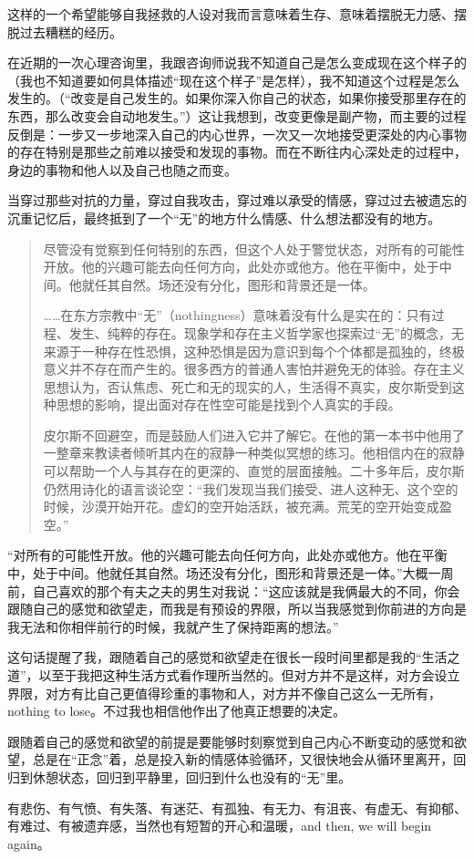 这样的一个希望能够自我拯救的人设对我而言意味着生存、意味着摆脱无力感、摆脱过去糟糕的经历。

在近期的一次心理咨询里，我跟咨询师说我不知道自己是怎么变成现在这个样子的（我也不知道要如何具体描述“现在这个样子”是怎样），我不知道这个过程是怎么发生的。（“改变是自己发生的。如果你深入你自己的状态，如果你接受那里存在的东西，那么改变会自动地发生。”）这让我想到，改变更像是副产物，而主要的过程反倒是：一步又一步地深入自己的内心世界，一次又一次地接受更深处的内心事物的存在\pozhehao{}特别是那些之前难以接受和发现的事物。而在不断往内心深处走的过程中，身边的事物和他人以及自己也随之而变。

当穿过那些对抗的力量，穿过自我攻击，穿过难以承受的情感，穿过过去被遗忘的沉重记忆后，最终抵到了一个“无”的地方\pozhehao{}什么情感、什么想法都没有的地方。

\blockquote{
尽管没有觉察到任何特别的东西，但这个人处于警觉状态，对所有的可能性开放。他的兴趣可能去向任何方向，此处亦或他方。他在平衡中，处于中间。他就任其自然。场还没有分化，图形和背景还是一体。

……在东方宗教中“无”（nothingness）意味着没有什么是实在的：只有过程、发生、纯粹的存在。现象学和存在主义哲学家也探索过“无”的概念，无来源于一种存在性恐惧，这种恐惧是因为意识到每个个体都是孤独的，终极意义并不存在而产生的。很多西方的普通人害怕并避免无的体验。存在主义思想认为，否认焦虑、死亡和无的现实的人，生活得不真实，皮尔斯受到这种思想的影响，提出面对存在性空可能是找到个人真实的手段。

皮尔斯不回避空，而是鼓励人们进入它并了解它。在他的第一本书中他用了一整章来教读者倾听其内在的寂静\pozhehao{}一种类似冥想的练习。他相信内在的寂静可以帮助一个人与其存在的更深的、直觉的层面接触。二十多年后，皮尔斯仍然用诗化的语言谈论空：“我们发现当我们接受、进人这种无、这个空的时候，沙漠开始开花。虚幻的空开始活跃，被充满。荒芜的空开始变成盈空。”

}

“对所有的可能性开放。他的兴趣可能去向任何方向，此处亦或他方。他在平衡中，处于中间。他就任其自然。场还没有分化，图形和背景还是一体。”大概一周前，自己喜欢的那个有夫之夫的男生对我说：“这应该就是我俩最大的不同，你会跟随自己的感觉和欲望走，而我是有预设的界限，所以当我感觉到你前进的方向是我无法和你相伴前行的时候，我就产生了保持距离的想法。”

这句话提醒了我，跟随着自己的感觉和欲望走在很长一段时间里都是我的“生活之道”，以至于我把这种生活方式看作理所当然的。但对方并不是这样，对方会设立界限，对方有比自己更值得珍重的事物和人，对方并不像自己这么一无所有，nothing to lose。不过我也相信他作出了他真正想要的决定。

跟随着自己的感觉和欲望的前提是要能够时刻察觉到自己内心不断变动的感觉和欲望，总是在“正念”着，总是投入新的情感体验循环，又很快地会从循环里离开，回归到休憩状态，回归到平静里，回归到什么也没有的“无”里。

有悲伤、有气愤、有失落、有迷茫、有孤独、有无力、有沮丧、有虚无、有抑郁、有难过、有被遗弃感，当然也有短暂的开心和温暖，and then, we will begin again。

